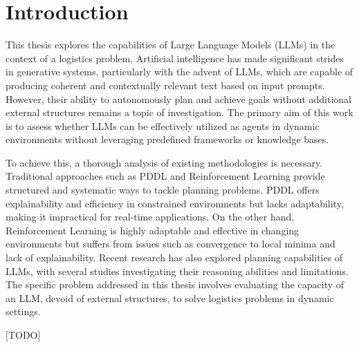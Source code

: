 \chapter{Introduction}
\label{cha:introduction}

This thesis explores the capabilities of Large Language Models (LLMs) in the
context of a logistics problem. Artificial intelligence has made significant strides
in generative systems, particularly with the advent of LLMs, which are capable of
producing coherent and contextually relevant text based on input prompts.
However, their ability to autonomously plan and achieve goals without additional
external structures remains a topic of investigation. The primary aim of this
work is to assess whether LLMs can be effectively utilized as agents in dynamic
environments without leveraging predefined frameworks or knowledge bases.

To achieve this, a thorough analysis of existing methodologies is necessary.
Traditional approaches such as PDDL and Reinforcement Learning provide
structured and systematic ways to tackle planning problems. PDDL offers explainability
and efficiency in constrained environments but lacks adaptability, making it
impractical for real-time applications. On the other hand, Reinforcement
Learning is highly adaptable and effective in changing environments but suffers
from issues such as convergence to local minima and lack of explainability. Recent
research has also explored planning capabilities of LLMs, with several studies
investigating their reasoning abilities and limitations. The specific problem addressed
in this thesis involves evaluating the capacity of an LLM, devoid of external
structures, to solve logistics problems in dynamic settings.

[TODO]
